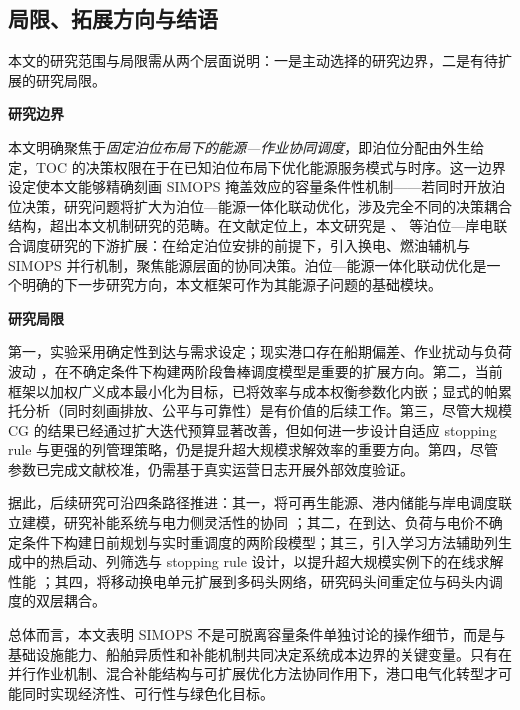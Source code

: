 \documentclass[UTF8, a4paper, 12pt]{ctexart}
\theoremstyle{plain}
\theoremstyle{definition}
\theoremstyle{remark}
\begin{document}
\subsection{局限、拓展方向与结语}
\label{sec:limitations}

本文的研究范围与局限需从两个层面说明：一是主动选择的研究边界，二是有待扩展的研究局限。

\textbf{研究边界}

本文明确聚焦于\emph{固定泊位布局下的能源—作业协同调度}，即泊位分配由外生给定，TOC 的决策权限在于在已知泊位布局下优化能源服务模式与时序。这一边界设定使本文能够精确刻画 SIMOPS 掩盖效应的容量条件性机制——若同时开放泊位决策，研究问题将扩大为泊位—能源一体化联动优化，涉及完全不同的决策耦合结构，超出本文机制研究的范畴。在文献定位上，本文研究是 \citet{Peng2021}、\citet{Iris2019} 等泊位—岸电联合调度研究的下游扩展：在给定泊位安排的前提下，引入换电、燃油辅机与 SIMOPS 并行机制，聚焦能源层面的协同决策。泊位—能源一体化联动优化是一个明确的下一步研究方向，本文框架可作为其能源子问题的基础模块。

\textbf{研究局限}

第一，实验采用确定性到达与需求设定；现实港口存在船期偏差、作业扰动与负荷波动 \citep{UNCTAD2021}，在不确定条件下构建两阶段鲁棒调度模型是重要的扩展方向。第二，当前框架以加权广义成本最小化为目标，已将效率与成本权衡参数化内嵌；显式的帕累托分析（同时刻画排放、公平与可靠性）是有价值的后续工作。第三，尽管大规模 CG 的结果已经通过扩大迭代预算显著改善，但如何进一步设计自适应 stopping rule 与更强的列管理策略，仍是提升超大规模求解效率的重要方向。第四，尽管参数已完成文献校准，仍需基于真实运营日志开展外部效度验证。

据此，后续研究可沿四条路径推进：其一，将可再生能源、港内储能与岸电调度联立建模，研究补能系统与电力侧灵活性的协同 \cite{Li2022_BSS}；其二，在到达、负荷与电价不确定条件下构建日前规划与实时重调度的两阶段模型；其三，引入学习方法辅助列生成中的热启动、列筛选与 stopping rule 设计，以提升超大规模实例下的在线求解性能 \cite{Bengio2021}；其四，将移动换电单元扩展到多码头网络，研究码头间重定位与码头内调度的双层耦合。

总体而言，本文表明 SIMOPS 不是可脱离容量条件单独讨论的操作细节，而是与基础设施能力、船舶异质性和补能机制共同决定系统成本边界的关键变量。只有在并行作业机制、混合补能结构与可扩展优化方法协同作用下，港口电气化转型才可能同时实现经济性、可行性与绿色化目标。

\FloatBarrier


\end{document}
